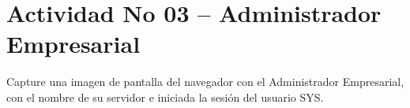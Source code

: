 \section{Actividad No 03 – Administrador Empresarial} 
Capture una imagen de pantalla del navegador con el Administrador Empresarial, con el nombre de su servidor e iniciada la sesión del usuario SYS.

